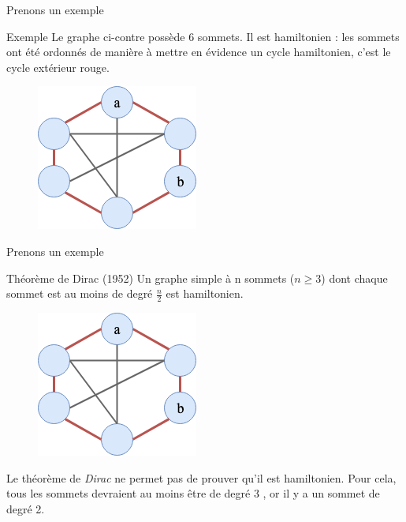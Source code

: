 \documentclass[10pt,xcolor=dvipsnames]{beamer}
\newcommand{\defin}[1]{\textcolor{darkspringgreen}{#1}}
\begin{document}
\begin{frame}{Prenons un exemple}
    \begin{exampleblock}{Exemple}
        Le graphe ci-contre possède 6 sommets. Il est \defin{hamiltonien} : les sommets ont été ordonnés de manière à mettre en évidence un \defin{cycle hamiltonien}, c'est le cycle extérieur rouge. 
    \end{exampleblock}
    \begin{figure}
        \centering
        \includegraphics[scale=0.6]{figures/CM3/graph-theorem-hamiltonian.png}
        \label{fig:my_label}
    \end{figure}
\end{frame}

\begin{frame}{Prenons un exemple}
        \begin{exampleblock}{Théorème de Dirac (1952)}
            Un graphe simple à n sommets ($n \geq 3$) dont chaque sommet est au moins de degré $\frac{n}{2}$ est \defin{hamiltonien}.
    \end{exampleblock}
    
        \begin{figure}
        \centering
        \includegraphics[scale=0.55]{figures/CM3/graph-theorem-hamiltonian.png}
        \label{fig:my_label}
    \end{figure}
    Le théorème de \textit{Dirac} ne permet pas de prouver qu'il est \defin{hamiltonien}. Pour cela, tous les sommets devraient au moins être de degré 3 , or il y a un sommet de degré 2.
\end{frame}
\end{document}
